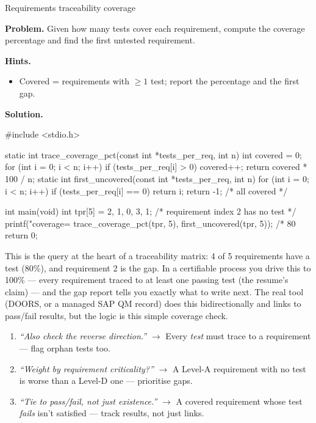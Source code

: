 \begin{gymproblem}{Requirements traceability coverage}

\textbf{Problem.} Given how many tests cover each requirement, compute the
coverage percentage and find the first untested requirement.

\textbf{Hints.}
\begin{itemize}
\item Covered = requirements with $\ge 1$ test; report the percentage and the
  first gap.
\end{itemize}

\attempt

\textbf{Solution.}
\begin{cgym}
#include <stdio.h>

static int trace_coverage_pct(const int *tests_per_req, int n) {
    int covered = 0;
    for (int i = 0; i < n; i++) if (tests_per_req[i] > 0) covered++;
    return covered * 100 / n;
}
static int first_uncovered(const int *tests_per_req, int n) {
    for (int i = 0; i < n; i++) if (tests_per_req[i] == 0) return i;
    return -1;       /* all covered */
}

int main(void) {
    int tpr[5] = {2, 1, 0, 3, 1};      /* requirement index 2 has no test */
    printf("coverage=%
           trace_coverage_pct(tpr, 5), first_uncovered(tpr, 5));   /* 80%
    return 0;
}
\end{cgym}

This is the query at the heart of a traceability matrix: 4 of 5 requirements have
a test (80\%), and requirement 2 is the gap. In a certifiable process you drive
this to 100\% --- every requirement traced to at least one passing test (the
resume's claim) --- and the gap report tells you exactly what to write next. The
real tool (DOORS, or a managed SAP QM record) does this bidirectionally and links
to pass/fail results, but the logic is this simple coverage check.

\followups
\begin{enumerate}
\item \emph{``Also check the reverse direction.''} $\rightarrow$ Every \emph{test}
  must trace to a requirement --- flag orphan tests too.
\item \emph{``Weight by requirement criticality?''} $\rightarrow$ A Level-A
  requirement with no test is worse than a Level-D one --- prioritise gaps.
\item \emph{``Tie to pass/fail, not just existence.''} $\rightarrow$ A covered
  requirement whose test \emph{fails} isn't satisfied --- track results, not just
  links.
\end{enumerate}
\end{gymproblem}

